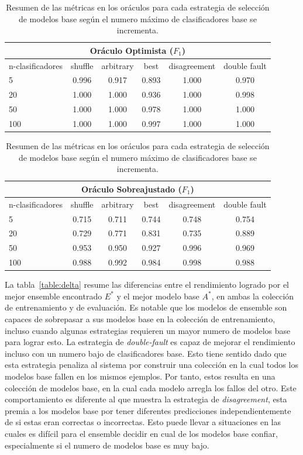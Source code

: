 \begin{table}[H]
    \centering

    \begin{tabular}{lccccc}
    \toprule
        \multicolumn{6}{c}{Oráculo Optimista ($F_1$)} \\ \midrule
        n-clasificadores & shuffle & arbitrary & best & disagreement & double fault  \\ \midrule \midrule
        5   & 0.996 & 0.917 & 0.893 & 1.000 & 0.970 \\
        20  & 1.000 & 1.000 & 0.936 & 1.000 & 0.998 \\
        50  & 1.000 & 1.000 & 0.978 & 1.000 & 1.000 \\
        100 & 1.000 & 1.000 & 0.997 & 1.000 & 1.000 \\
    \bottomrule
    \end{tabular}

    \begin{tabular}{lccccc}
    \toprule
        \multicolumn{6}{c}{Oráculo Sobreajustado ($F_1$)} \\ \midrule
        n-clasificadores & shuffle & arbitrary & best & disagreement & double fault  \\ \midrule \midrule
        5   & 0.715 & 0.711 & 0.744 & 0.748 & 0.754 \\
        20  & 0.729 & 0.771 & 0.831 & 0.735 & 0.889 \\
        50  & 0.953 & 0.950 & 0.927 & 0.996 & 0.969 \\
        100 & 0.988 & 0.992 & 0.984 & 0.998 & 0.988 \\
    \bottomrule
    \end{tabular}

    \caption{Resumen de las métricas en los oráculos para cada estrategia de selección de modelos base según el numero máximo de clasificadores base se incrementa.}
    \label{table:oracle}
\end{table}

La tabla~\ref{table:delta} resume las diferencias entre el rendimiento logrado por el mejor ensemble encontrado $E^*$ y el mejor modelo base $A^*$, en ambas la colección de entrenamiento y de evaluación.
Es notable que los modelos de ensemble son capaces de sobrepasar a sus modelos base en la colección de entrenamiento, incluso cuando algunas estrategias requieren un mayor numero de modelos base para lograr esto.
La estrategia de \emph{double-fault} es capaz de mejorar el rendimiento incluso con un numero bajo de clasificadores base.
Esto tiene sentido dado que esta estrategia penaliza al sistema por construir una colección en la cual todos los modelos base fallen en los mismos ejemplos.
Por tanto, estos resulta en una colección de modelos base, en la cual cada modelo arregla los fallos del otro.
Este comportamiento es diferente al que muestra la estrategia de \emph{disagreement}, esta premia a los modelos base por tener diferentes predicciones independientemente de si estas eran correctas o incorrectas.
Esto puede llevar a situaciones en las cuales es difícil para el ensemble decidir en cual de los modelos base confiar, especialmente si el numero de modelos base es muy bajo.

